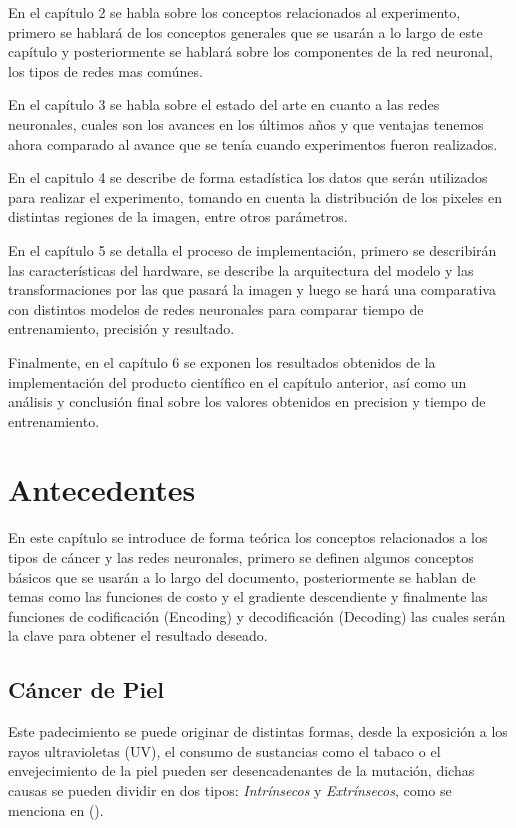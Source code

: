 En el capítulo 2 se habla sobre los conceptos relacionados al experimento, primero se hablará de los conceptos generales que se usarán a lo largo de este capítulo y posteriormente se hablará sobre los componentes de la red neuronal, los tipos de redes mas comúnes. 

En el capítulo 3 se habla sobre el estado del arte en cuanto a las redes neuronales, cuales son los avances en los últimos años y que ventajas tenemos ahora comparado al avance que se tenía cuando experimentos fueron realizados.

En el capitulo 4 se describe de forma estadística los datos que serán utilizados para realizar el experimento, tomando en cuenta la distribución de los pixeles en distintas regiones de la imagen, entre otros parámetros. 

En el capítulo 5 se detalla el proceso de implementación, primero se describirán las características del hardware, se describe la arquitectura del modelo y las transformaciones por las que pasará la imagen y luego se hará una comparativa con distintos modelos de redes neuronales para comparar tiempo de entrenamiento, precisión y resultado.

Finalmente, en el capítulo 6 se exponen los resultados obtenidos de la implementación del producto científico en el capítulo anterior, así como un análisis y conclusión final sobre los valores obtenidos en precision y tiempo de entrenamiento. 

\chapter{Antecedentes}
En este capítulo se introduce de forma teórica los conceptos relacionados a los tipos de cáncer y las redes neuronales, primero se definen algunos conceptos básicos que se usarán a lo largo del documento, posteriormente se hablan de temas como las funciones de costo y el gradiente descendiente y finalmente las funciones de codificación (Encoding) y decodificación (Decoding) las cuales serán la clave para obtener el resultado deseado.

\section{Cáncer de Piel}

Este padecimiento se puede originar de distintas formas, desde la exposición a los rayos ultravioletas (UV), el consumo de sustancias como el tabaco o el envejecimiento de la piel pueden ser desencadenantes de la mutación, dichas causas se pueden dividir en dos tipos: \emph{Intrínsecos} y \emph{Extrínsecos}, como se menciona en \citeauthor{skin_1} (\citeyear{skin_1}).

